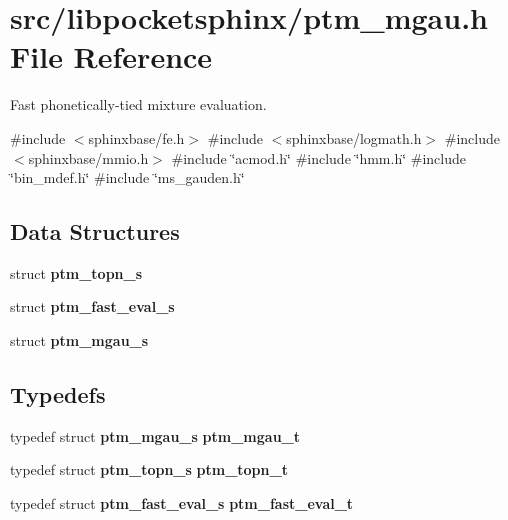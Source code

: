 \section{src/libpocketsphinx/ptm\-\_\-mgau.h \-File \-Reference}
\label{ptm__mgau_8h}


\-Fast phonetically-\/tied mixture evaluation.  


{\ttfamily \#include $<$sphinxbase/fe.\-h$>$}\*
{\ttfamily \#include $<$sphinxbase/logmath.\-h$>$}\*
{\ttfamily \#include $<$sphinxbase/mmio.\-h$>$}\*
{\ttfamily \#include \char`\"{}acmod.\-h\char`\"{}}\*
{\ttfamily \#include \char`\"{}hmm.\-h\char`\"{}}\*
{\ttfamily \#include \char`\"{}bin\-\_\-mdef.\-h\char`\"{}}\*
{\ttfamily \#include \char`\"{}ms\-\_\-gauden.\-h\char`\"{}}\*
\subsection*{\-Data \-Structures}
\begin{DoxyCompactItemize}
\item 
struct {\bf ptm\-\_\-topn\-\_\-s}
\item 
struct {\bf ptm\-\_\-fast\-\_\-eval\-\_\-s}
\item 
struct {\bf ptm\-\_\-mgau\-\_\-s}
\end{DoxyCompactItemize}
\subsection*{\-Typedefs}
\begin{DoxyCompactItemize}
\item 
typedef struct {\bf ptm\-\_\-mgau\-\_\-s} {\bfseries ptm\-\_\-mgau\-\_\-t}\label{ptm__mgau_8h_ab1e3230da8b59628476ecdf70e97ec9a}

\item 
typedef struct {\bf ptm\-\_\-topn\-\_\-s} {\bfseries ptm\-\_\-topn\-\_\-t}\label{ptm__mgau_8h_a4542a2b38a0c0b8ea62432f63fa3c921}

\item 
typedef struct {\bf ptm\-\_\-fast\-\_\-eval\-\_\-s} {\bfseries ptm\-\_\-fast\-\_\-eval\-\_\-t}\label{ptm__mgau_8h_af870ed22578ba58631d06a1c01752ced}

\end{DoxyCompactItemize}
